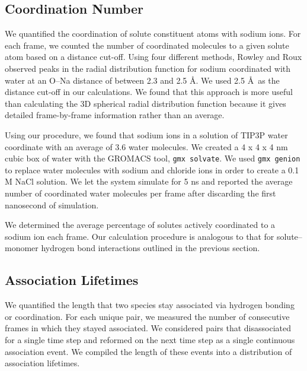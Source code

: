 \documentclass[journal=jpcbfk,manuscript=article]{achemso}
\begin{document}
  \subsection{Coordination Number}\label{method:coordination}

  We quantified the coordination of solute constituent atoms with sodium ions.
  For each frame, we counted the number of coordinated molecules to a
  given solute atom based on a distance cut-off. Using four different methods,
  Rowley and Roux observed peaks in the radial distribution function for sodium
  coordinated with water at an O--Na distance of between 2.3 and 2.5 \AA.
  \cite{rowley_solvation_2012} We used 2.5 \AA~as the distance cut-off in our
  calculations. We found that this approach is more useful than calculating 
  the 3D spherical radial distribution function because it gives detailed 
  frame-by-frame information rather than an average. 
  
  Using our procedure, we found that sodium ions in a solution of TIP3P water
  coordinate with an average of 3.6 water molecules. We created a 4 x 4 x 4
  nm cubic box of water with the GROMACS tool, \texttt{gmx solvate}. We used
  \texttt{gmx genion} to replace water molecules with sodium and chloride 
  ions in order to create a 0.1 M NaCl solution. We let the system simulate
  for 5 ns and reported the average number of coordinated water molecules 
  per frame after discarding the first nanosecond of simulation.
  
  We determined the average percentage of solutes actively coordinated to
  a sodium ion each frame. Our calculation procedure is analogous to that for
  solute--monomer hydrogen bond interactions outlined in the previous section.
  
  \subsection{Association Lifetimes}\label{method:lifetimes}
  
  We quantified the length that two species stay associated via hydrogen
  bonding or coordination. For each unique pair, we measured the number of 
  consecutive frames in which they stayed associated. We considered pairs
  that disassociated for a single time step and reformed on the next time
  step as a single continuous association event. We compiled the length 
  of these events into a distribution of association lifetimes.
  
\end{document}
